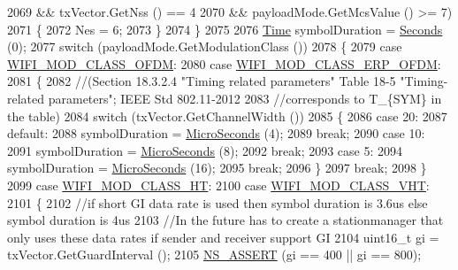 \begin{DoxyCode}
2069           && txVector.GetNss () == 4
2070           && payloadMode.GetMcsValue () >= 7)
2071         \{
2072           Nes = 6;
2073         \}
2074     \}
2075 
2076   \hyperlink{namespacens3_1_1TracedValueCallback_a7ffd3e7c142ffe7c8a1d2db9b8de38ec}{Time} symbolDuration = \hyperlink{group__timecivil_ga33c34b816f8ff6628e33d5c8e9713b9e}{Seconds} (0);
2077   \textcolor{keywordflow}{switch} (payloadMode.GetModulationClass ())
2078     \{
2079     \textcolor{keywordflow}{case} \hyperlink{namespacens3_aa999e1221606a2b21b1eb33c2007c217a30a83a0318357c9611f09e6faadc8006}{WIFI\_MOD\_CLASS\_OFDM}:
2080     \textcolor{keywordflow}{case} \hyperlink{namespacens3_aa999e1221606a2b21b1eb33c2007c217afc1f5ef8d2c985f37a3224dd86ab014d}{WIFI\_MOD\_CLASS\_ERP\_OFDM}:
2081       \{
2082         \textcolor{comment}{//(Section 18.3.2.4 "Timing related parameters" Table 18-5 "Timing-related parameters"; IEEE Std
       802.11-2012}
2083         \textcolor{comment}{//corresponds to T\_\{SYM\} in the table)}
2084         \textcolor{keywordflow}{switch} (txVector.GetChannelWidth ())
2085           \{
2086           \textcolor{keywordflow}{case} 20:
2087           \textcolor{keywordflow}{default}:
2088             symbolDuration = \hyperlink{group__timecivil_ga17465a639c8d1464e76538afdd78a9f0}{MicroSeconds} (4);
2089             \textcolor{keywordflow}{break};
2090           \textcolor{keywordflow}{case} 10:
2091             symbolDuration = \hyperlink{group__timecivil_ga17465a639c8d1464e76538afdd78a9f0}{MicroSeconds} (8);
2092             \textcolor{keywordflow}{break};
2093           \textcolor{keywordflow}{case} 5:
2094             symbolDuration = \hyperlink{group__timecivil_ga17465a639c8d1464e76538afdd78a9f0}{MicroSeconds} (16);
2095             \textcolor{keywordflow}{break};
2096           \}
2097         \textcolor{keywordflow}{break};
2098       \}
2099     \textcolor{keywordflow}{case} \hyperlink{namespacens3_aa999e1221606a2b21b1eb33c2007c217a6ac45cac36cc4454649435d24ebf349c}{WIFI\_MOD\_CLASS\_HT}:
2100     \textcolor{keywordflow}{case} \hyperlink{namespacens3_aa999e1221606a2b21b1eb33c2007c217a9863e4342bf5c238c74dddfc4d96c67e}{WIFI\_MOD\_CLASS\_VHT}:
2101       \{
2102         \textcolor{comment}{//if short GI data rate is used then symbol duration is 3.6us else symbol duration is 4us}
2103         \textcolor{comment}{//In the future has to create a stationmanager that only uses these data rates if sender and
       receiver support GI}
2104         uint16\_t gi = txVector.GetGuardInterval ();
2105         \hyperlink{assert_8h_a6dccdb0de9b252f60088ce281c49d052}{NS\_ASSERT} (gi == 400 || gi == 800);

\end{DoxyCode}
